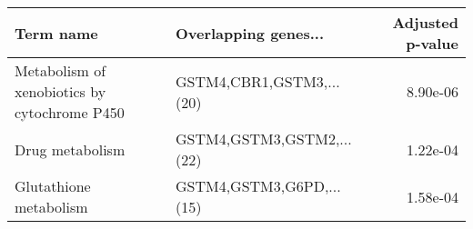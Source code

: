 \begin{tabular}{llr}
\toprule
                                   Term name &      Overlapping genes... &  Adjusted p-value \\
\midrule
Metabolism of xenobiotics by cytochrome P450 &  GSTM4,CBR1,GSTM3,...(20) &          8.90e-06 \\
                             Drug metabolism & GSTM4,GSTM3,GSTM2,...(22) &          1.22e-04 \\
                      Glutathione metabolism &  GSTM4,GSTM3,G6PD,...(15) &          1.58e-04 \\
\bottomrule
\end{tabular}
